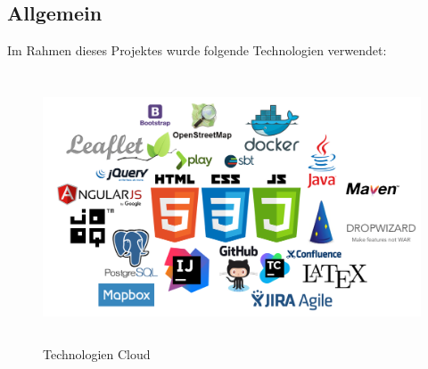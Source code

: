 \subsection*{Allgemein}
Im Rahmen dieses Projektes wurde folgende Technologien verwendet:\\
\begin{figure}[H]
\centering
\includegraphics[height=8cm]{images/cloud.png}
\caption{Technologien Cloud}
\label{fig:technologycloud}
\end{figure}
\noindent